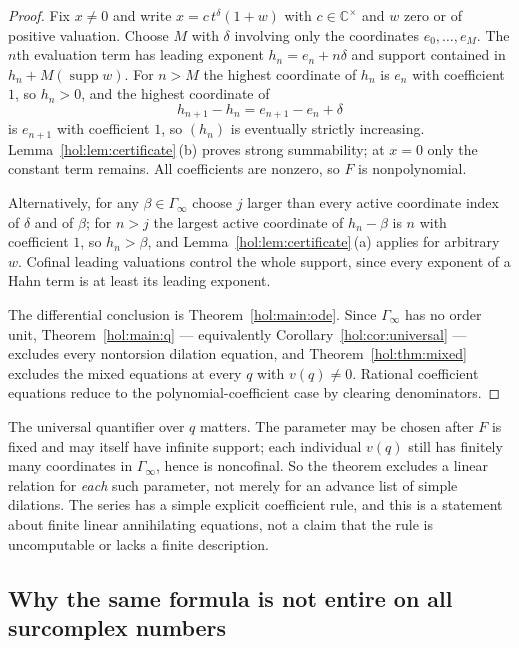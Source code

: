 \documentclass[11pt]{article}
\numberwithin{equation}{section}
\theoremstyle{definition}
\theoremstyle{remark}
\newcommand{\C}{\mathbb C}
\newcommand{\supp}{\operatorname{supp}}
\begin{document}
\begin{proof}
Fix $x\ne0$ and write $x=c\,t^\delta(1+w)$ with $c\in\C^\times$ and $w$ zero
or of positive valuation. Choose $M$ with $\delta$ involving only the
coordinates $e_0,\ldots,e_M$. The $n$th evaluation term has leading exponent
$h_n=e_n+n\delta$ and support contained in $h_n+M(\supp w)$. For $n>M$ the
highest coordinate of $h_n$ is $e_n$ with coefficient $1$, so $h_n>0$, and the
highest coordinate of
\[
 h_{n+1}-h_n=e_{n+1}-e_n+\delta
\]
is $e_{n+1}$ with coefficient $1$, so $(h_n)$ is eventually strictly
increasing. Lemma~\ref{hol:lem:certificate}\,(b) proves strong summability; at
$x=0$ only the constant term remains. All coefficients are nonzero, so $F$ is
nonpolynomial.

Alternatively, for any $\beta\in\Gamma_\infty$ choose $j$ larger than every
active coordinate index of $\delta$ and of $\beta$; for $n>j$ the largest
active coordinate of $h_n-\beta$ is $n$ with coefficient $1$, so $h_n>\beta$,
and Lemma~\ref{hol:lem:certificate}\,(a) applies for arbitrary $w$.
Cofinal leading valuations control the whole support, since every exponent
of a Hahn term is at least its leading exponent.

The differential conclusion is Theorem~\ref{hol:main:ode}. Since
$\Gamma_\infty$ has no order unit, Theorem~\ref{hol:main:q} --- equivalently
Corollary~\ref{hol:cor:universal} --- excludes every nontorsion dilation
equation, and Theorem~\ref{hol:thm:mixed} excludes the mixed equations at
every $q$ with $v(q)\ne0$. Rational coefficient equations reduce to the
polynomial-coefficient case by clearing denominators.
\end{proof}

The universal quantifier over $q$ matters. The parameter may be chosen after
$F$ is fixed and may itself have infinite support; each individual $v(q)$
still has finitely many coordinates in $\Gamma_\infty$, hence is noncofinal.
So the theorem excludes a linear relation for \emph{each} such parameter, not
merely for an advance list of simple dilations. The series has a simple
explicit coefficient rule, and this is a statement about finite linear
annihilating equations, not a claim that the rule is uncomputable or lacks a
finite description.

\subsection{Why the same formula is not entire on all surcomplex numbers}
\label{hol:sub:notallsurcomplex}
\end{document}
